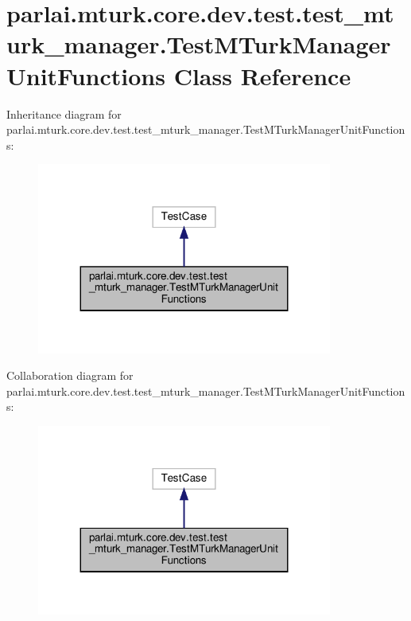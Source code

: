 \hypertarget{classparlai_1_1mturk_1_1core_1_1dev_1_1test_1_1test__mturk__manager_1_1TestMTurkManagerUnitFunctions}{}\section{parlai.\+mturk.\+core.\+dev.\+test.\+test\+\_\+mturk\+\_\+manager.\+Test\+M\+Turk\+Manager\+Unit\+Functions Class Reference}
\label{classparlai_1_1mturk_1_1core_1_1dev_1_1test_1_1test__mturk__manager_1_1TestMTurkManagerUnitFunctions}


Inheritance diagram for parlai.\+mturk.\+core.\+dev.\+test.\+test\+\_\+mturk\+\_\+manager.\+Test\+M\+Turk\+Manager\+Unit\+Functions\+:
\nopagebreak
\begin{figure}[H]
\begin{center}
\leavevmode
\includegraphics[width=275pt]{df/dcd/classparlai_1_1mturk_1_1core_1_1dev_1_1test_1_1test__mturk__manager_1_1TestMTurkManagerUnitFunctions__inherit__graph}
\end{center}
\end{figure}


Collaboration diagram for parlai.\+mturk.\+core.\+dev.\+test.\+test\+\_\+mturk\+\_\+manager.\+Test\+M\+Turk\+Manager\+Unit\+Functions\+:
\nopagebreak
\begin{figure}[H]
\begin{center}
\leavevmode
\includegraphics[width=275pt]{dd/d54/classparlai_1_1mturk_1_1core_1_1dev_1_1test_1_1test__mturk__manager_1_1TestMTurkManagerUnitFunctions__coll__graph}
\end{center}
\end{figure}
